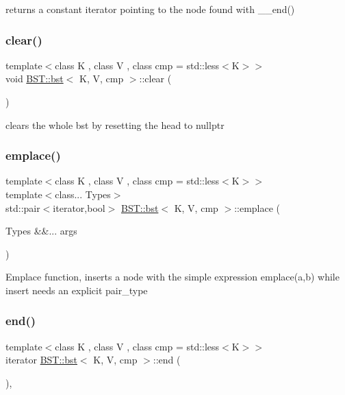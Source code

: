 returns a constant iterator pointing to the node found with \+\_\+\+\_\+end() \mbox{\label{classBST_1_1bst_a25224d3f487fe02a1be8767e4fc3b8fd}} 
\subsubsection{\texorpdfstring{clear()}{clear()}}
{\footnotesize\ttfamily template$<$class K , class V , class cmp  = std\+::less$<$\+K$>$$>$ \\
void \hyperlink{classBST_1_1bst}{B\+S\+T\+::bst}$<$ K, V, cmp $>$\+::clear (\begin{DoxyParamCaption}{ }\end{DoxyParamCaption})\hspace{0.3cm}{\ttfamily [inline]}}

clears the whole bst by resetting the head to nullptr \mbox{\label{classBST_1_1bst_a39b5fa926b67f6f4089e32aeb63a74b9}} 
\subsubsection{\texorpdfstring{emplace()}{emplace()}}
{\footnotesize\ttfamily template$<$class K , class V , class cmp  = std\+::less$<$\+K$>$$>$ \\
template$<$class... Types$>$ \\
std\+::pair$<$iterator,bool$>$ \hyperlink{classBST_1_1bst}{B\+S\+T\+::bst}$<$ K, V, cmp $>$\+::emplace (\begin{DoxyParamCaption}\item[{Types \&\&...}]{args }\end{DoxyParamCaption})\hspace{0.3cm}{\ttfamily [inline]}}

Emplace function, inserts a node with the simple expression emplace(a,b) while insert needs an explicit pair\+\_\+type \mbox{\label{classBST_1_1bst_a3620e47dedded6930a8b0488fe6ced6b}} 
\subsubsection{\texorpdfstring{end()}{end()}\hspace{0.1cm}{\footnotesize\ttfamily [1/2]}}
{\footnotesize\ttfamily template$<$class K , class V , class cmp  = std\+::less$<$\+K$>$$>$ \\
iterator \hyperlink{classBST_1_1bst}{B\+S\+T\+::bst}$<$ K, V, cmp $>$\+::end (\begin{DoxyParamCaption}{ }\end{DoxyParamCaption})\hspace{0.3cm}{\ttfamily [inline]}, {\ttfamily [noexcept]}}

